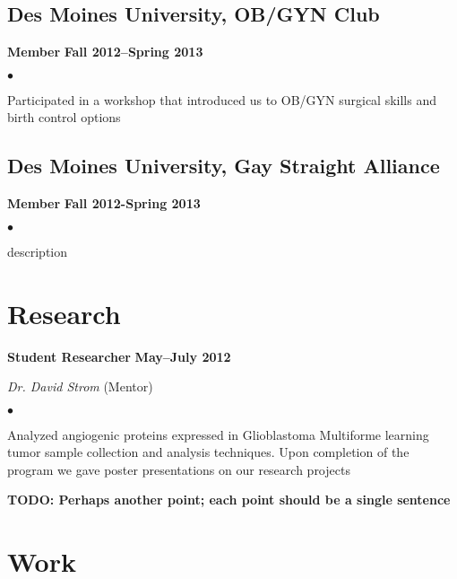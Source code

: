 \documentclass[10pt,letterpaper]{article}
\renewenvironment{itemize}{
  \begin{list}{}{
      \setlength{\leftmargin}{1.5em}
      \setlength{\itemsep}{0.25em}
      \setlength{\parskip}{0pt}
      \setlength{\parsep}{0.25em}
    }
  }{
  \end{list}
}
\newenvironment{bitemize}{
  \begin{list}{$\bullet$}{
      \setlength{\leftmargin}{1.5em}
      \setlength{\itemsep}{0.25em}
      \setlength{\parskip}{0pt}
      \setlength{\parsep}{0.25em}
    }
  }{
  \end{list}
}
\newcommand{\yearrange}[1]{\hfill \textbf{#1} \par}
\begin{document}
\subsection*{Des Moines University, OB/GYN Club}
\begin{itemize}
\item \textbf{Member} \yearrange{Fall 2012--Spring 2013}
  \begin{bitemize}
  \item Participated in a workshop that introduced us to OB/GYN surgical
  skills and birth control options
    \end{bitemize}
\end{itemize}

\subsection*{Des Moines University, Gay Straight Alliance}
\begin{itemize}
\item \textbf{Member} \yearrange{Fall 2012-Spring 2013}
  \begin{bitemize}
  \item description
  \end{bitemize}
\end{itemize}


\section*{Research}

\begin{itemize}
\item \textbf{Student Researcher} \yearrange{May--July 2012}
  \textit{Dr. David Strom} (Mentor)
  \begin{bitemize}
  \item Analyzed angiogenic proteins expressed in Glioblastoma
    Multiforme learning tumor sample collection and analysis
    techniques. Upon completion of the program we gave poster
    presentations on our research projects
  \item \textbf{TODO: Perhaps another point; each point should be a
    single sentence}
  \end{bitemize}
\end{itemize}

\section*{Work}
\end{document}
